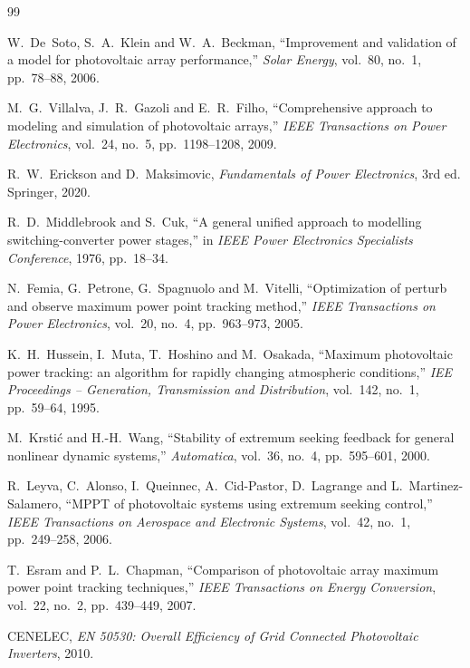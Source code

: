 \documentclass[12pt,a4paper,oneside]{report}
\theoremstyle{definition}
\begin{document}
\appendix



\begin{thebibliography}{99}

 W.~De~Soto, S.~A.~Klein and W.~A.~Beckman, ``Improvement and validation of a model for photovoltaic array performance,'' \emph{Solar Energy}, vol.~80, no.~1, pp.~78--88, 2006.

 M.~G.~Villalva, J.~R.~Gazoli and E.~R.~Filho, ``Comprehensive approach to modeling and simulation of photovoltaic arrays,'' \emph{IEEE Transactions on Power Electronics}, vol.~24, no.~5, pp.~1198--1208, 2009.

 R.~W.~Erickson and D.~Maksimovic, \emph{Fundamentals of Power Electronics}, 3rd ed. Springer, 2020.

 R.~D.~Middlebrook and S.~Cuk, ``A general unified approach to modelling switching-converter power stages,'' in \emph{IEEE Power Electronics Specialists Conference}, 1976, pp.~18--34.

 N.~Femia, G.~Petrone, G.~Spagnuolo and M.~Vitelli, ``Optimization of perturb and observe maximum power point tracking method,'' \emph{IEEE Transactions on Power Electronics}, vol.~20, no.~4, pp.~963--973, 2005.

 K.~H.~Hussein, I.~Muta, T.~Hoshino and M.~Osakada, ``Maximum photovoltaic power tracking: an algorithm for rapidly changing atmospheric conditions,'' \emph{IEE Proceedings -- Generation, Transmission and Distribution}, vol.~142, no.~1, pp.~59--64, 1995.

 M.~Krsti\'{c} and H.-H.~Wang, ``Stability of extremum seeking feedback for general nonlinear dynamic systems,'' \emph{Automatica}, vol.~36, no.~4, pp.~595--601, 2000.

 R.~Leyva, C.~Alonso, I.~Queinnec, A.~Cid-Pastor, D.~Lagrange and L.~Martinez-Salamero, ``MPPT of photovoltaic systems using extremum seeking control,'' \emph{IEEE Transactions on Aerospace and Electronic Systems}, vol.~42, no.~1, pp.~249--258, 2006.

 T.~Esram and P.~L.~Chapman, ``Comparison of photovoltaic array maximum power point tracking techniques,'' \emph{IEEE Transactions on Energy Conversion}, vol.~22, no.~2, pp.~439--449, 2007.

 CENELEC, \emph{EN 50530: Overall Efficiency of Grid Connected Photovoltaic Inverters}, 2010.


\end{thebibliography}
\end{document}
